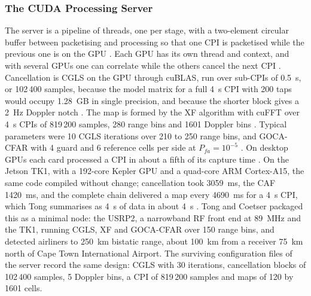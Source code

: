 \subsubsection{The CUDA Processing Server}
\label{subsubsec:ch2.implementations.uct.cudaprocserver}
\todo{}
The server is a pipeline of threads, one per stage, with a two-element circular buffer between packetising and processing so that one CPI is packetised while the previous one is on the GPU \citep{tong2014}. Each GPU has its own thread and context, and with several GPUs one can correlate while the others cancel the next CPI \citep{tong2014}. Cancellation is CGLS on the GPU through cuBLAS, run over sub-CPIs of 0.5~s, or 102\,400 samples, because the model matrix for a full 4~s CPI with 200 taps would occupy 1.28~GB in single precision, and because the shorter block gives a 2~Hz Doppler notch \citep{tong2014}. The map is formed by the XF algorithm with cuFFT over 4~s CPIs of 819\,200 samples, 280 range bins and 1601 Doppler bins \citep{tong2014}. Typical parameters were 10 CGLS iterations over 210 to 250 range bins, and GOCA-CFAR with 4 guard and 6 reference cells per side at $P_{fa} = 10^{-5}$ \citep{tong2014}. On desktop GPUs each card processed a CPI in about a fifth of its capture time \citep{tong2014}. On the Jetson TK1, with a 192-core Kepler GPU and a quad-core ARM Cortex-A15, the same code compiled without change; cancellation took 3059~ms, the CAF 1420~ms, and the complete chain delivered a map every 4690~ms for a 4~s CPI, which Tong summarises as 4~s of data in about 4~s \citep{tong2014}. Tong and Coetser \citep{tong2015} packaged this as a minimal node: the USRP2, a narrowband RF front end at 89~MHz and the TK1, running CGLS, XF and GOCA-CFAR over 150 range bins, and detected airliners to 250~km bistatic range, about 100~km from a receiver 75~km north of Cape Town International Airport. The surviving configuration files of the server record the same design: CGLS with 30 iterations, cancellation blocks of 102\,400 samples, 5 Doppler bins, a CPI of 819\,200 samples and maps of 120 by 1601 cells.

